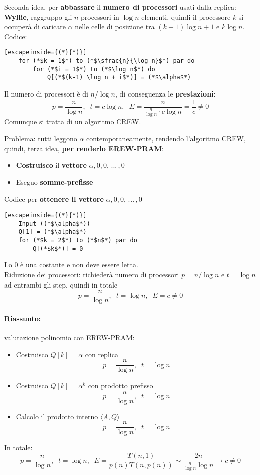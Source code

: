 \nn

Seconda idea, per \textbf{abbassare} il \textbf{numero di processori} usati dalla replica: \textbf{Wyllie}, raggruppo gli $n$ processori in $\log n$ elementi, quindi il processore $k$ si occuperà di caricare $\alpha$ nelle celle di posizione tra $(k-1) \log n + 1$ e $k \log n$.\\

Codice: 
\begin{lstlisting}[escapeinside={(*}{*)}]
	for (*$k = 1$*) to (*$\sfrac{n}{\log n}$*) par do 
		for (*$i = 1$*) to (*$\log n$*) do
			Q[(*$(k-1) \log n + i$*)] = (*$\alpha$*)
\end{lstlisting}
Il numero di processori è di $n/\log n$, di conseguenza le \textbf{prestazioni}: 
$$ p = \frac{n}{\log n}, \;\; t = c \log n, \;\; E = \frac{n}{\frac{n}{\log n} \cdot c \log n}  = \frac{1}{c} \neq 0 $$
Comunque si tratta di un algoritmo CREW.\\

\newpage

Problema: tutti leggono $\alpha$ contemporaneamente, rendendo l'algoritmo CREW, quindi, terza idea, \textbf{per renderlo EREW-PRAM}: 
\begin{itemize}
	\item \textbf{Costruisco} il \textbf{vettore} $\alpha, 0, 0, \, ... \, , 0$
	\item Eseguo \textbf{somme-prefisse}
\end{itemize}

Codice per \textbf{ottenere il vettore} $\alpha, 0, 0, \, ... \, , 0$
\begin{lstlisting}[escapeinside={(*}{*)}]
	Input ((*$\alpha$*))
	Q[1] = (*$\alpha$*)
	for (*$k = 2$*) to (*$n$*) par do
		Q[(*$k$*)] = 0 
\end{lstlisting}
Lo 0 è una costante e non deve essere letta.\\

Riduzione dei processori: richiederà numero di processori $p = n/\log n$ e $t = \log n$ ad entrambi gli step, quindi in totale
$$ p = \frac{n}{\log n}, \;\; t = \log n, \;\; E = c \neq 0 $$

\paragraph{Riassunto:} valutazione polinomio con EREW-PRAM:
\begin{itemize}
	\item Costruisco $Q[k] = \alpha$ con replica
	$$ p = \frac{n}{\log n}, \;\; t = \log n $$
	
	\item Costruisco $Q[k] = \alpha^k$ con prodotto prefisso
	$$ p = \frac{n}{\log n}, \;\; t = \log n $$
	
	\item Calcolo il prodotto interno $\langle A, Q \rangle$
	$$ p = \frac{n}{\log n}, \;\; t = \log n $$
\end{itemize}
In totale:
$$ p = \frac{n}{\log n}, \;\; t = \log n, \;\; E = \frac{T(n,1)}{p(n) T(n, p(n))} \sim \frac{2n}{\frac{n}{\log n} \log n} \rightarrow c \neq 0 $$

